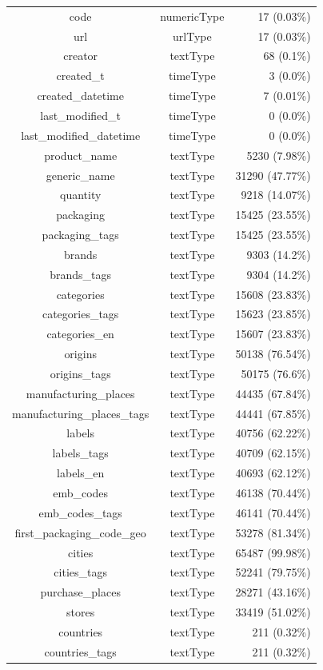 \documentclass[11pt]{article}
\begin{document}
\begin{center}
\begin{longtable}{|c|c|r|}
code& numericType& 17 (0.03\%)\\
url& urlType& 17 (0.03\%)\\
creator& textType& 68 (0.1\%)\\
created\_t& timeType& 3 (0.0\%)\\
created\_datetime& timeType& 7 (0.01\%)\\
last\_modified\_t& timeType& 0 (0.0\%)\\
last\_modified\_datetime& timeType& 0 (0.0\%)\\
product\_name& textType& 5230 (7.98\%)\\
generic\_name& textType& 31290 (47.77\%)\\
quantity& textType& 9218 (14.07\%)\\
packaging& textType& 15425 (23.55\%)\\
packaging\_tags& textType& 15425 (23.55\%)\\
brands& textType& 9303 (14.2\%)\\
brands\_tags& textType& 9304 (14.2\%)\\
categories& textType& 15608 (23.83\%)\\
categories\_tags& textType& 15623 (23.85\%)\\
categories\_en& textType& 15607 (23.83\%)\\
origins& textType& 50138 (76.54\%)\\
origins\_tags& textType& 50175 (76.6\%)\\
manufacturing\_places& textType& 44435 (67.84\%)\\
manufacturing\_places\_tags& textType& 44441 (67.85\%)\\
labels& textType& 40756 (62.22\%)\\
labels\_tags& textType& 40709 (62.15\%)\\
labels\_en& textType& 40693 (62.12\%)\\
emb\_codes& textType& 46138 (70.44\%)\\
emb\_codes\_tags& textType& 46141 (70.44\%)\\
first\_packaging\_code\_geo& textType& 53278 (81.34\%)\\
cities& textType& 65487 (99.98\%)\\
cities\_tags& textType& 52241 (79.75\%)\\
purchase\_places& textType& 28271 (43.16\%)\\
stores& textType& 33419 (51.02\%)\\
countries& textType& 211 (0.32\%)\\
countries\_tags& textType& 211 (0.32\%)\\

\end{longtable}
\end{center}
\end{document}

